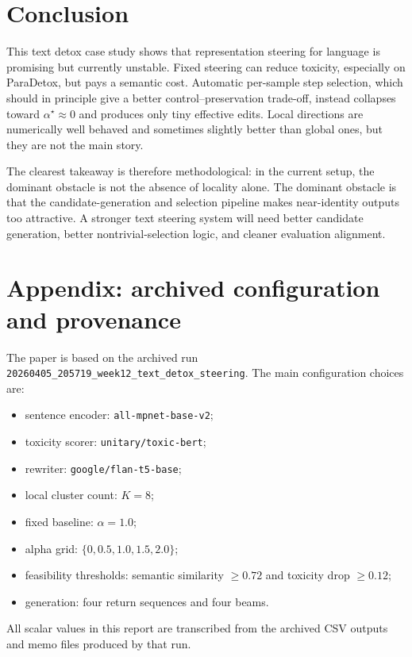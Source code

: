 \documentclass[10pt,twocolumn]{article}
\begin{document}
\section{Conclusion}
This text detox case study shows that representation steering for language is promising but currently unstable. Fixed steering can reduce toxicity, especially on ParaDetox, but pays a semantic cost. Automatic per-sample step selection, which should in principle give a better control--preservation trade-off, instead collapses toward $\alpha^\star\approx 0$ and produces only tiny effective edits. Local directions are numerically well behaved and sometimes slightly better than global ones, but they are not the main story.

The clearest takeaway is therefore methodological: in the current setup, the dominant obstacle is not the absence of locality alone. The dominant obstacle is that the candidate-generation and selection pipeline makes near-identity outputs too attractive. A stronger text steering system will need better candidate generation, better nontrivial-selection logic, and cleaner evaluation alignment.

\section*{Appendix: archived configuration and provenance}
The paper is based on the archived run \texttt{20260405\_205719\_week12\_text\_detox\_steering}. The main configuration choices are:
\begin{itemize}[leftmargin=1.2em,itemsep=0.08em]
\item sentence encoder: \texttt{all-mpnet-base-v2};
\item toxicity scorer: \texttt{unitary/toxic-bert};
\item rewriter: \texttt{google/flan-t5-base};
\item local cluster count: $K=8$;
\item fixed baseline: $\alpha=1.0$;
\item alpha grid: $\{0,0.5,1.0,1.5,2.0\}$;
\item feasibility thresholds: semantic similarity $\ge 0.72$ and toxicity drop $\ge 0.12$;
\item generation: four return sequences and four beams.
\end{itemize}
All scalar values in this report are transcribed from the archived CSV outputs and memo files produced by that run.
\end{document}

